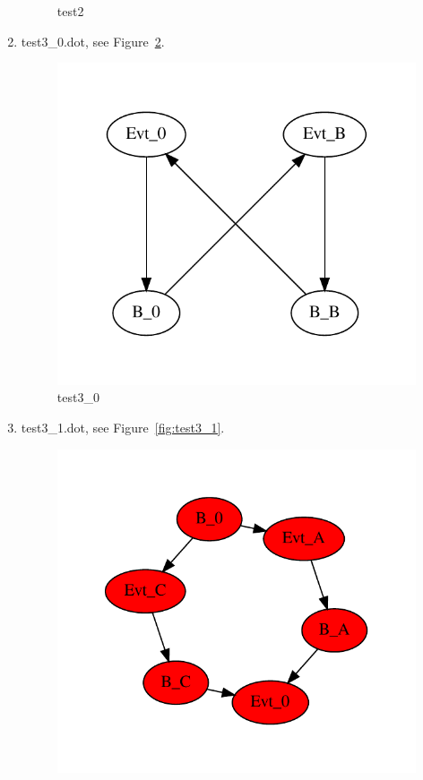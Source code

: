 \documentclass[12pt,a4paper]{report}
\begin{document}
\begin{enumerate}
\begin{figure}
        \caption{test2}
        \label{fig:test2}
    \end{figure}
\item test3\_0.dot, see Figure~\ref{fig:test3_0}.
    \begin{figure}
        \centering
        \includegraphics*[width=1.0\textwidth,keepaspectratio]{TestPattern/test3_0.pdf}
        \caption{test3\_0}
        \label{fig:test3_0}
    \end{figure}
\item test3\_1.dot, see Figure~\ref{fig:test3_1}.
    \begin{figure}
        \centering
        \includegraphics*[width=1.0\textwidth,keepaspectratio]{TestPattern/test3_1.pdf}

\end{figure}
\end{enumerate}
\end{document}
